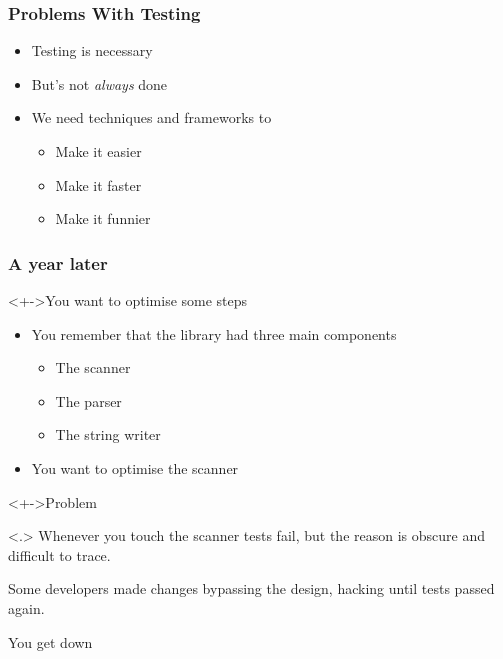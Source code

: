 
\begin{frame}
  \frametitle{Problems With Testing}

  \begin{itemize}
  \item Testing is necessary
  \item But's not \textit{always} done
  \item We need techniques and frameworks to
    \begin{itemize}
    \item Make it easier
    \item Make it faster
    \item Make it funnier
    \end{itemize}
  \end{itemize}
\end{frame}

\begin{frame}
  \frametitle{A year later}

  \begin{block}<+->{You want to optimise some steps}
    \begin{itemize}
    \item You remember that the library had three main components
      \begin{itemize}
      \item The scanner
      \item The parser
      \item The string writer
      \end{itemize}
    \item You want to optimise the scanner
    \end{itemize}
  \end{block}

  \begin{alertblock}<+->{Problem}
    \begin{overprint}
      \onslide<.> Whenever you touch the scanner tests fail, but the reason is
      obscure and difficult to trace.

      \onslide<+> Some developers made changes bypassing the design, hacking
      until tests passed again.

      \onslide<+> You get down
    \end{overprint}
  \end{alertblock}
\end{frame}

